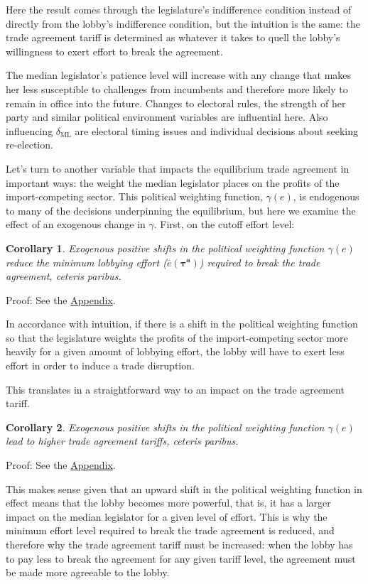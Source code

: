 \documentclass[authoryear, review]{elsarticle}
\newtheorem{corollary}{Corollary}
\newcommand{\ov}{\overline}
\newcommand{\bta}{\bm{\tau^a}}
\newcommand{\ga}{\gamma}
\newcommand{\de}{\delta}
\begin{document}
Here the result comes through the legislature's indifference condition instead of directly from the lobby's indifference condition, but the intuition is the same: the trade agreement tariff is determined as whatever it takes to quell the lobby's willingness to exert effort to break the agreement.

The median legislator's patience level will increase with any change that makes her less susceptible to challenges from incumbents and therefore more likely to remain in office into the future. Changes to electoral rules, the strength of her party and similar political environment variables are influential here. Also influencing $\de_\text{ML}$ are electoral timing issues and individual decisions about seeking re-election.

Let's turn to another variable that impacts the equilibrium trade agreement in important ways: the weight the median legislator places on the profits of the import-competing sector. This political weighting function, $\ga(e)$, is endogenous to many of the decisions underpinning the equilibrium, but here we examine the effect of an exogenous change in $\ga$. First, on the cutoff effort level:

\begin{corollary}
  \label{cor:eg}
  Exogenous positive shifts in the political weighting function $\ga(e)$ reduce the minimum lobbying effort ($\ov{e}(\bta)$) required to break the trade agreement, \emph{ceteris paribus}.

\end{corollary}

Proof: See the \hyperlink{Cor_eg}{Appendix}.

\noindent In accordance with intuition, if there is a shift in the political weighting function so that the legislature weights the profits of the import-competing sector more heavily for a given amount of lobbying effort, the lobby will have to exert less effort in order to induce a trade disruption.

This translates in a straightforward way to an impact on the trade agreement tariff.

\begin{corollary}
  Exogenous positive shifts in the political weighting function $\ga(e)$ lead to higher trade agreement tariffs, \emph{ceteris paribus}.
  \label{cor:tg}
\end{corollary}

Proof: See the \hyperlink{Cor_tg}{Appendix}.

\noindent This makes sense given that an upward shift in the political weighting function in effect means that the lobby becomes more powerful, that is, it has a larger impact on the median legislator for a given level of effort. This is why the minimum effort level required to break the trade agreement is reduced, and therefore why the trade agreement tariff must be increased: when the lobby has to pay less to break the agreement for any given tariff level, the agreement must be made more agreeable to the lobby.
\end{document}
